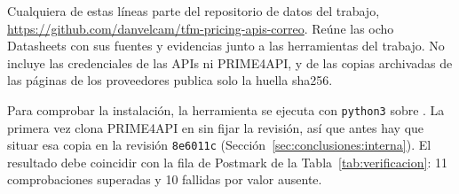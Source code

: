 \label{sec:conclusiones:replicacion}Cualquiera de estas líneas parte del repositorio de datos del trabajo, \url{https://github.com/danvelcam/tfm-pricing-apis-correo}.
Reúne las ocho Datasheets con sus fuentes y evidencias junto a las herramientas del trabajo.
No incluye las credenciales de las APIs ni PRIME4API, y de las copias archivadas de las páginas de los proveedores publica solo la huella sha256.

Para comprobar la instalación, la herramienta  se ejecuta con \texttt{python3} sobre .
La primera vez clona PRIME4API en  sin fijar la revisión, así que antes hay que situar esa copia en la revisión \texttt{8e6011c} (Sección~\ref{sec:conclusiones:interna}).
El resultado debe coincidir con la fila de Postmark de la Tabla~\ref{tab:verificacion}: 11 comprobaciones superadas y 10 fallidas por valor ausente.
